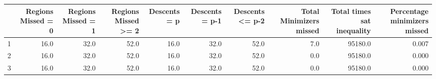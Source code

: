 \begin{tabular}{lrrrrrrrrr}
\toprule
{} &  Regions Missed = 0 &  Regions Missed = 1 &  Regions Missed >= 2 &  Descents = p &  Descents = p-1 &  Descents <= p-2 &  Total Minimizers missed &  Total times sat inequality &  Percentage minimizers missed \\
\midrule
1 &                16.0 &                32.0 &                 52.0 &          16.0 &            32.0 &             52.0 &                      7.0 &                     95180.0 &                         0.007 \\
2 &                16.0 &                32.0 &                 52.0 &          16.0 &            32.0 &             52.0 &                      0.0 &                     95180.0 &                         0.000 \\
3 &                16.0 &                32.0 &                 52.0 &          16.0 &            32.0 &             52.0 &                      0.0 &                     95180.0 &                         0.000 \\
\bottomrule
\end{tabular}

